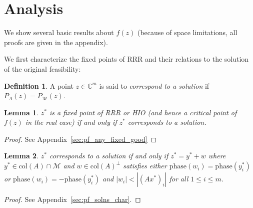 \documentclass[journal]{IEEEtran}
\newtheorem{lemma}{Lemma}
\theoremstyle{definition}
\newtheorem{definition}{Definition}
\theoremstyle{remark}
\theoremstyle{definition}
\theoremstyle{problem}
\theoremstyle{definition}
\newcommand{\blem}{\begin{lemma}}
\newcommand{\elem}{\end{lemma}}
\newcommand{\bpof}{\begin{proof}}
\newcommand{\epof}{\end{proof}}
\newcommand{\bdefn}{\begin{definition}}
\newcommand{\edefn}{\end{definition}}
\newcommand{\col}{\text{col}}
\newcommand{\CC}{\mathbb{C}}
\newcommand{\MM}{\mathcal{M}}
\newcommand{\TODO}[1]{{\color{red}{[#1]}}}
\begin{document}
%
%
%

\section{Analysis}

We show several basic results about $f(z)$ (because of space limitations, all proofs are given in the appendix).

We first characterize the fixed points of RRR and their relations to the solution of the original feasibility:
\bdefn\label{defn:soln} A point $z\in\CC^m$ is said to \emph{correspond to a solution} if $P_A(z) = P_{\MM}(z)$. \edefn

\blem\label{lem:any_fixed_is_good} $z^*$ is a fixed point of RRR or HIO (and hence a critical point of $f(z)$ in the real case) if and only if $z^*$ corresponds to a solution. \elem
\bpof See Appendix~\ref{sec:pf_any_fixed_good} \epof

\blem\label{lem:solns_char} $z^*$ corresponds to a solution if and only if $z^* = y^* + w$ where $y^*\in\col(A)\cap \MM$ and $w\in\col(A)^{\perp}$ satisfies either $\text{phase}(w_i) = \text{phase}(y^*_i)$ or $\text{phase}(w_i) = -\text{phase}(y^*_i)$ and $|w_i|<|(Ax^*)_i|$ for all $1\leq i\leq m$. \elem
\bpof  See Appendix~\ref{sec:pf_solns_char}. \epof
\end{document}
